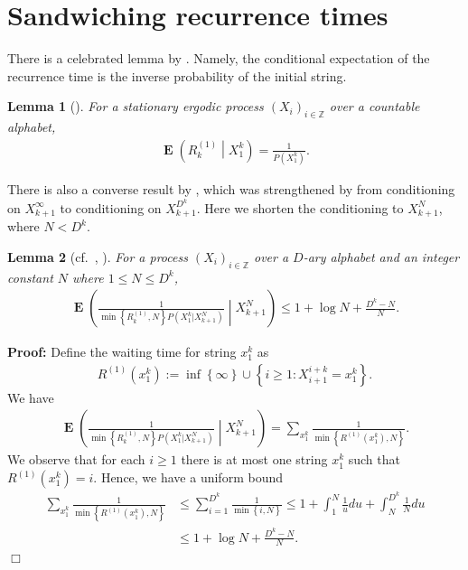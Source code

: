 \documentclass[a4paper,12pt]{article}
\newcommand{\okra}[1]{\left( #1 \right)}
\newcommand{\klam}[1]{\left\{ #1 \right\}}
\DeclareMathOperator{\mean}{\mathbf{E}}
\newtheorem{lemma}{Lemma}
\newenvironment*{proof}{\begin{trivlist}\item[]
\noindent\textbf{Proof:}}{$\Box$\par\end{trivlist}}
\begin{document}


\section{Sandwiching recurrence times}
\label{secRecurrence}

There is a celebrated lemma by \citeauthor{Kac47}. Namely, the
conditional expectation of the recurrence time is the inverse
probability of the initial string.
\begin{lemma}[\citep{Kac47}]
  \label{theoKac}
  For a stationary ergodic process $(X_i)_{i\in\mathbb{Z}}$ over a
  countable alphabet,
  \begin{align}
    \mean\okra{R^{(1)}_k\middle|X_1^k}
    =
    \frac{1}{P(X_1^k)}.
  \end{align}
\end{lemma}
There is also a converse result by \citet{Kontoyiannis98}, which was
strengthened by \citet{Debowski18b} from conditioning on
$X_{k+1}^\infty$ to conditioning on $X_{k+1}^{D^k}$. Here we shorten
the conditioning to $X_{k+1}^{N}$, where $N<D^k$.
\begin{lemma}[cf.\ \citep{Kontoyiannis98}, \mbox{\citep[Lemma 2]{Debowski18b}}]
  \label{theoKontoyiannis}
  For a process $(X_i)_{i\in\mathbb{Z}}$ over a $D$-ary alphabet and
  an integer constant $N$ where $1\le N\le D^k$,
  \begin{align}
    \mean\okra{\frac{1}{\min\klam{R^{(1)}_k,N}
    P(X_1^k|X_{k+1}^N)}\middle|X_{k+1}^N}
    \le
    1+\log N+\frac{D^k-N}{N}.
  \end{align}
\end{lemma}
\begin{proof}
  Define the waiting time for string $x_1^k$ as
  \begin{align}
   R^{(1)}(x_1^k):=\inf\klam{\infty}\cup\klam{i\ge 1: X_{i+1}^{i+k}=x_1^k}. 
  \end{align}
  We have
  \begin{align}
    \mean\okra{\frac{1}{\min\klam{R^{(1)}_k,N}
    P(X_1^k|X_{k+1}^N)}\middle|X_{k+1}^N}
    =
    \sum_{x_1^k}\frac{1}{\min\klam{R^{(1)}(x_1^k),N}}.
  \end{align}
  We observe that for each $i\ge 1$ there is at most one string
  $x_1^k$ such that $R^{(1)}(x_1^k)=i$. Hence, we have a uniform bound
\begin{align}
  \sum_{x_1^k}\frac{1}{\min\klam{R^{(1)}(x_1^k),N}}
  &\le
  \sum_{i=1}^{D^k}\frac{1}{\min\klam{i,N}}
  \le
    1+\int_{1}^{N}\frac{1}{u}du+\int_{N}^{D^k}\frac{1}{N}du
    \nonumber\\
  &\le
  1+\log N+\frac{D^k-N}{N}.
\end{align}
\end{proof}
\end{document}
